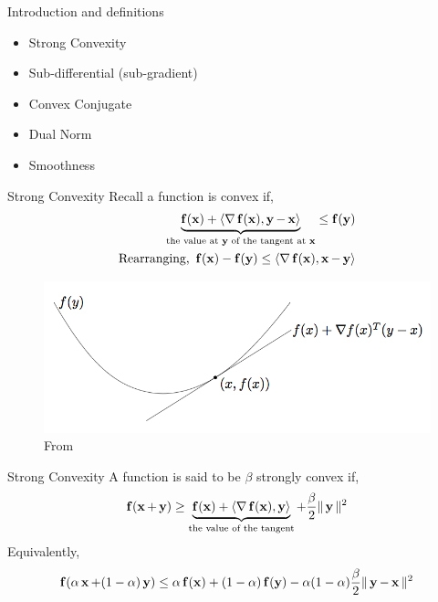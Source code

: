 \begin{frame}{Introduction and definitions}
  \begin{itemize}
  \item Strong Convexity
  \item Sub-differential (sub-gradient)
  \item Convex Conjugate
  \item Dual Norm
  \item Smoothness
  \end{itemize}
\end{frame}
\begin{frame}{Strong Convexity}
  Recall a function is convex if,
  \begin{align*} 
    \underbrace{\f(\x) + \dotprod{\grad \f(\x)}{\y-\x}}_{\text{the value at $\y$ of the tangent at $\x$}} \le \f(\y) \\
    \text{Rearranging, } \f(\x)-\f(\y) \le \dotprod{\grad \f(\x)} {\x-\y} \\
  \end{align*}
  \begin{figure}
    \includegraphics[scale=0.27]{images/convexity.png}
    \caption{From \cite{BV2004}}
  \end{figure}
\end{frame}

\begin{frame}{Strong Convexity}
  A function is said to be $\beta$ strongly convex if,
  \begin{align*}
    \f(\x+\y) \ge \underbrace{\f(\x) + \dotprod{\grad \f(\x)}{\y}}_{\text{the value of the tangent}} +\frac{\beta}{2} \|\y\|^2
  \end{align*}
  Equivalently,
  \begin{align*}
    \f(\alpha \x +(1-\alpha)\y) \le \alpha \f(\x) + (1-\alpha)\f(\y) - \alpha(1-\alpha)\frac{\beta}{2} \|\y-\x\|^2
  \end{align*}
\end{frame}


